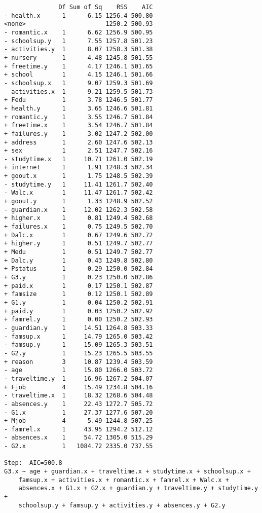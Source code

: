\documentclass[11pt]{article}
\begin{document}
\begin{enumerate}
\begin{verbatim}
               Df Sum of Sq    RSS    AIC
- health.x      1      6.15 1256.4 500.80
<none>                      1250.2 500.93
- romantic.x    1      6.62 1256.9 500.95
- schoolsup.y   1      7.55 1257.8 501.23
- activities.y  1      8.07 1258.3 501.38
+ nursery       1      4.48 1245.8 501.55
+ freetime.y    1      4.17 1246.1 501.65
+ school        1      4.15 1246.1 501.66
- schoolsup.x   1      9.07 1259.3 501.69
- activities.x  1      9.21 1259.5 501.73
+ Fedu          1      3.78 1246.5 501.77
+ health.y      1      3.65 1246.6 501.81
+ romantic.y    1      3.55 1246.7 501.84
+ freetime.x    1      3.54 1246.7 501.84
+ failures.y    1      3.02 1247.2 502.00
+ address       1      2.60 1247.6 502.13
+ sex           1      2.51 1247.7 502.16
- studytime.x   1     10.71 1261.0 502.19
+ internet      1      1.91 1248.3 502.34
+ goout.x       1      1.75 1248.5 502.39
- studytime.y   1     11.41 1261.7 502.40
- Walc.x        1     11.47 1261.7 502.42
+ goout.y       1      1.33 1248.9 502.52
- guardian.x    1     12.02 1262.3 502.58
+ higher.x      1      0.81 1249.4 502.68
+ failures.x    1      0.75 1249.5 502.70
+ Dalc.x        1      0.67 1249.6 502.72
+ higher.y      1      0.51 1249.7 502.77
+ Medu          1      0.51 1249.7 502.77
+ Dalc.y        1      0.43 1249.8 502.80
+ Pstatus       1      0.29 1250.0 502.84
+ G3.y          1      0.23 1250.0 502.86
+ paid.x        1      0.17 1250.1 502.87
+ famsize       1      0.12 1250.1 502.89
+ G1.y          1      0.04 1250.2 502.91
+ paid.y        1      0.03 1250.2 502.92
+ famrel.y      1      0.00 1250.2 502.93
- guardian.y    1     14.51 1264.8 503.33
- famsup.x      1     14.79 1265.0 503.42
- famsup.y      1     15.09 1265.3 503.51
- G2.y          1     15.23 1265.5 503.55
+ reason        3     10.87 1239.4 503.59
- age           1     15.80 1266.0 503.72
- traveltime.y  1     16.96 1267.2 504.07
+ Fjob          4     15.49 1234.8 504.16
- traveltime.x  1     18.32 1268.6 504.48
- absences.y    1     22.43 1272.7 505.72
- G1.x          1     27.37 1277.6 507.20
+ Mjob          4      5.49 1244.8 507.25
- famrel.x      1     43.95 1294.2 512.12
- absences.x    1     54.72 1305.0 515.29
- G2.x          1   1084.72 2335.0 737.55

Step:  AIC=500.8
G3.x ~ age + guardian.x + traveltime.x + studytime.x + schoolsup.x + 
    famsup.x + activities.x + romantic.x + famrel.x + Walc.x + 
    absences.x + G1.x + G2.x + guardian.y + traveltime.y + studytime.y + 
    schoolsup.y + famsup.y + activities.y + absences.y + G2.y


\end{verbatim}
\end{enumerate}
\end{document}
